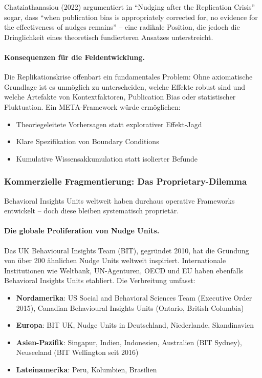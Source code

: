 Chatziathanasiou (2022) argumentiert in ``Nudging after the Replication Crisis'' sogar, dass ``when publication bias is appropriately corrected for, no evidence for the effectiveness of nudges remains'' -- eine radikale Position, die jedoch die Dringlichkeit eines theoretisch fundierteren Ansatzes unterstreicht.

\paragraph{Konsequenzen für die Feldentwicklung.}
Die Replikationskrise offenbart ein fundamentales Problem: Ohne axiomatische Grundlage ist es unmöglich zu unterscheiden, welche Effekte robust sind und welche Artefakte von Kontextfaktoren, Publication Bias oder statistischer Fluktuation. Ein META-Framework würde ermöglichen:

\begin{itemize}
    \item Theoriegeleitete Vorhersagen statt explorativer Effekt-Jagd
    \item Klare Spezifikation von Boundary Conditions
    \item Kumulative Wissensakkumulation statt isolierter Befunde
\end{itemize}

\subsubsection{Kommerzielle Fragmentierung: Das Proprietary-Dilemma}

Behavioral Insights Units weltweit haben durchaus operative Frameworks entwickelt -- doch diese bleiben systematisch proprietär.

\paragraph{Die globale Proliferation von Nudge Units.}
Das UK Behavioural Insights Team (BIT), gegründet 2010, hat die Gründung von über 200 ähnlichen Nudge Units weltweit inspiriert. Internationale Institutionen wie Weltbank, UN-Agenturen, OECD und EU haben ebenfalls Behavioral Insights Units etabliert. Die Verbreitung umfasst:

\begin{itemize}
    \item \textbf{Nordamerika}: US Social and Behavioral Sciences Team (Executive Order 2015), Canadian Behavioural Insights Units (Ontario, British Columbia)
    \item \textbf{Europa}: BIT UK, Nudge Units in Deutschland, Niederlande, Skandinavien
    \item \textbf{Asien-Pazifik}: Singapur, Indien, Indonesien, Australien (BIT Sydney), Neuseeland (BIT Wellington seit 2016)
    \item \textbf{Lateinamerika}: Peru, Kolumbien, Brasilien
\end{itemize}


